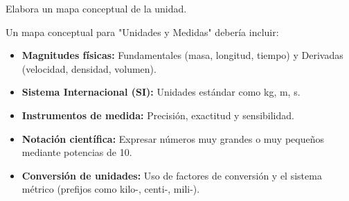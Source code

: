 \begin{exercise}
    Elabora un mapa conceptual de la unidad.

    \begin{solu}
        Un mapa conceptual para "Unidades y Medidas" debería incluir:
        \begin{itemize}
            \item \textbf{Magnitudes físicas:} Fundamentales (masa, longitud, tiempo) y Derivadas (velocidad, densidad, volumen).
            \item \textbf{Sistema Internacional (SI):} Unidades estándar como \unit{\kg}, \unit{\m}, \unit{\s}.
            \item \textbf{Instrumentos de medida:} Precisión, exactitud y sensibilidad.
            \item \textbf{Notación científica:} Expresar números muy grandes o muy pequeños mediante potencias de 10.
            \item \textbf{Conversión de unidades:} Uso de factores de conversión y el sistema métrico (prefijos como kilo-, centi-, mili-).
        \end{itemize}
    \end{solu}

\end{exercise}


